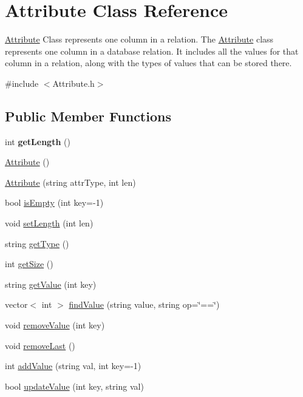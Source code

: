 \hypertarget{class_attribute}{\section{Attribute Class Reference}
\label{class_attribute}
}


\hyperlink{class_attribute}{Attribute} Class represents one column in a relation. The \hyperlink{class_attribute}{Attribute} class represents one column in a database relation. It includes all the values for that column in a relation, along with the types of values that can be stored there.  




{\ttfamily \#include $<$Attribute.\-h$>$}

\subsection*{Public Member Functions}
\begin{DoxyCompactItemize}
\item 
\hypertarget{class_attribute_aeac4704598e6d1a514a1b2d19cac3cca}{int {\bfseries get\-Length} ()}\label{class_attribute_aeac4704598e6d1a514a1b2d19cac3cca}

\item 
\hyperlink{class_attribute_a8ba4e5a507aef352563e1e56f1930e66}{Attribute} ()
\item 
\hyperlink{class_attribute_a02233dafef63f06ff9402c160e0f9373}{Attribute} (string attr\-Type, int len)
\item 
bool \hyperlink{class_attribute_a1ef67e13c131f9e3ac6a6a2adbb6e5aa}{is\-Empty} (int key=-\/1)
\item 
void \hyperlink{class_attribute_ace0103128f51d118718413c48ba5180d}{set\-Length} (int len)
\item 
string \hyperlink{class_attribute_a7fbbc68ab2f0dbef61e783842deca1e3}{get\-Type} ()
\item 
int \hyperlink{class_attribute_aab394210caea68ab5fc7bbab5ce33abe}{get\-Size} ()
\item 
string \hyperlink{class_attribute_a8df7ea306c5eede720d1933f6a46c337}{get\-Value} (int key)
\item 
vector$<$ int $>$ \hyperlink{class_attribute_a675aebbedeb6349cc9c001fb31884c10}{find\-Value} (string value, string op=\char`\"{}==\char`\"{})
\item 
void \hyperlink{class_attribute_a714539d4184caef6ad6accd8b29dcb4c}{remove\-Value} (int key)
\item 
void \hyperlink{class_attribute_af75dab2d3c606606d8fca11bb54d4314}{remove\-Last} ()
\item 
int \hyperlink{class_attribute_a2e7e01c0077452815fd6e0420d15ba06}{add\-Value} (string val, int key=-\/1)
\item 
bool \hyperlink{class_attribute_a248d912b1d34554143e4424d0228198b}{update\-Value} (int key, string val)
\end{DoxyCompactItemize}
